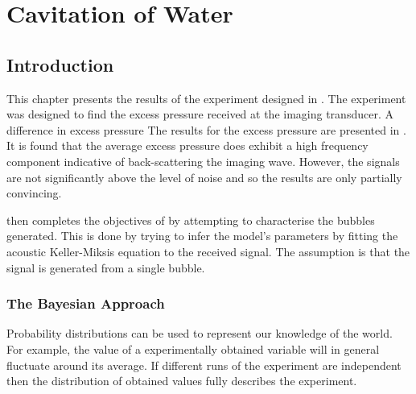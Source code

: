 \newcommand{\pEE}{\unit{1.1}\mega\pascal}
\newcommand{\pOOE}{\unit{1.4}\mega\pascal}
\newcommand{\pOTT}{\unit{2.8}\mega\pascal}

\chapter{Cavitation of Water}\label{ch:water_cavitation}



\section{Introduction}

This chapter presents the results of the experiment designed in .
The experiment was designed to find the excess pressure
received at the imaging transducer.
A difference in excess pressure 
%
The results for the excess pressure are presented in .
It is found that the average excess pressure 
does exhibit a high frequency component indicative of back-scattering the imaging wave.
However, the signals are not significantly above the level of noise
and so the results are only partially convincing.
 

 then completes the objectives of 
by attempting to characterise the bubbles generated.
This is done by trying to infer the model's parameters
by fitting the acoustic Keller-Miksis equation to the received signal.
The assumption is that the signal is generated from a single bubble.

\subsection{The Bayesian Approach}
Probability distributions can be used to represent our knowledge of the world.
For example, the value of a  experimentally obtained variable will in general
fluctuate around its average.  
If different runs of the experiment are independent
then the  distribution of obtained values fully describes the experiment.

